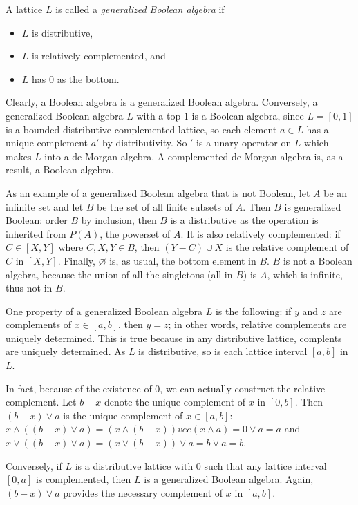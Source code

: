 \documentclass[12pt]{article}
\begin{document}
A lattice $L$ is called a \emph{generalized Boolean algebra} if 
\begin{itemize}
\item $L$ is distributive,
\item $L$ is relatively complemented, and
\item $L$ has $0$ as the bottom.
\end{itemize}

Clearly, a Boolean algebra is a generalized Boolean algebra.  Conversely, a generalized Boolean algebra $L$ with a top $1$ is a Boolean algebra, since $L=[0,1]$ is a bounded distributive complemented lattice, so each element $a\in L$ has a unique complement $a'$ by distributivity.  So $'$ is a unary operator on $L$ which makes $L$ into a de Morgan algebra.  A complemented de Morgan algebra is, as a result, a Boolean algebra.

As an example of a generalized Boolean algebra that is not Boolean, let $A$ be an infinite set and let $B$ be the set of all finite subsets of $A$.  Then $B$ is generalized Boolean: order $B$ by inclusion, then $B$ is a distributive as the operation is inherited from $P(A)$, the powerset of $A$.  It is also relatively complemented: if $C\in [X,Y]$ where $C,X,Y\in B$, then $(Y-C)\cup X$ is the relative complement of $C$ in $[X,Y]$.  Finally, $\varnothing$ is, as usual, the bottom element in $B$.  $B$ is not a Boolean algebra, because the union of all the singletons (all in $B$) is $A$, which is infinite, thus not in $B$.

One property of a generalized Boolean algebra $L$ is the following: if $y$ and $z$ are complements of $x\in [a,b]$, then $y=z$; in other words, relative complements are uniquely determined.  This is true because in any distributive lattice, complents are uniquely determined.  As $L$ is distributive, so is each lattice interval $[a,b]$ in $L$.  

In fact, because of the existence of $0$, we can actually construct the relative complement.  Let $b-x$ denote the unique complement of $x$ in $[0,b]$.  Then $(b-x)\vee a$ is the unique complement of $x\in [a,b]$: $x\wedge ((b-x)\vee a)=(x\wedge (b-x))vee (x\wedge a)=0\vee a=a$ and $x\vee ((b-x)\vee a)=(x\vee (b-x))\vee a=b\vee a=b$.

Conversely, if $L$ is a distributive lattice with $0$ such that any lattice interval $[0,a]$ is complemented, then $L$ is a generalized Boolean algebra.  Again, $(b-x)\vee a$ provides the necessary complement of $x$ in $[a,b]$.
\end{document}
